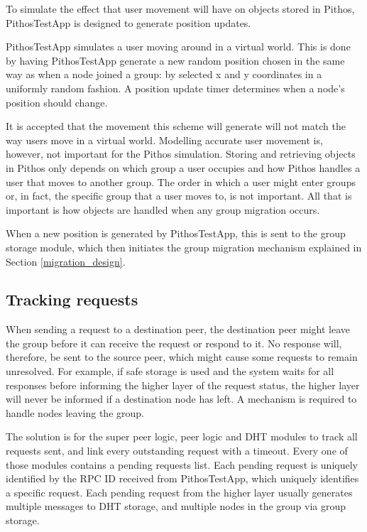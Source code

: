 To simulate the effect that user movement will have on objects stored in Pithos, PithosTestApp is designed to generate position updates.

PithosTestApp simulates a user moving around in a virtual world. This is done by having PithosTestApp generate a new random position chosen in the same way as when a node joined a group: by selected x and y coordinates in a uniformly random fashion. A position update timer determines when a node's position should change.

It is accepted that the movement this scheme will generate will not match the way users move in a virtual world. Modelling accurate user movement is, however, not important for the Pithos simulation. Storing and retrieving objects in Pithos only depends on which group a user occupies and how Pithos handles a user that moves to another group. The order in which a user might enter groups or, in fact, the specific group that a user moves to, is not important. All that is important is how objects are handled when any group migration occurs.

When a new position is generated by PithosTestApp, this is sent to the group storage module, which then initiates the group migration mechanism explained in Section \ref{migration_design}.

\subsection{Tracking requests}
\label{pending_rpcs_implementation}

When sending a request to a destination peer, the destination peer might leave the group before it can receive the request or respond to it. No response will, therefore, be sent to the source peer, which might cause some requests to remain unresolved. For example, if safe storage is used and the system waits for all responses before informing the higher layer of the request status, the higher layer will never be informed if a destination node has left. A mechanism is required to handle nodes leaving the group.

The solution is for the super peer logic, peer logic and DHT modules to track all requests sent, and link every outstanding request with a timeout. Every one of those modules contains a pending requests list. Each pending request is uniquely identified by the RPC ID received from PithosTestApp, which uniquely identifies a specific request. Each pending request from the higher layer usually generates multiple messages to DHT storage, and multiple nodes in the group via group storage.

